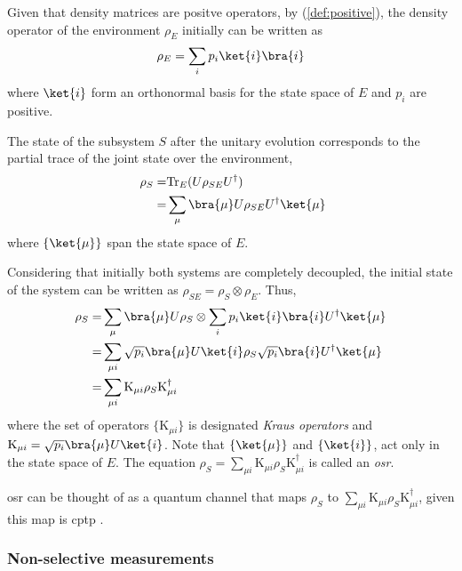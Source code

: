 Given that density matrices are positve operators, by (\autoref{def:positive}), the density operator of the environment $\rho_E$ initially can be written as 
\begin{equation*}
  \rho_E = \sum_{i} p_{i} \ket{i} \bra{i}
\end{equation*}
where $\ket{i}$ form an orthonormal basis for the state space of $E$ and $p_{i}$ are positive. 

The state of the subsystem $S$ after the unitary evolution corresponds to the partial trace of the joint state over the environment,
\begin{align*}
  \rho_{S} = & \text{Tr}_{E}(U \rho_{SE} U^{\dag}) \\
 = & \sum_{\mu} \bra{\mu} U \rho_{SE} U^{\dag} \ket{\mu}
\end{align*}
where $\{\ket{\mu}\}$ span the state space of $E$.

 
Considering that initially both systems are completely decoupled, the initial state of the system can be written as $ \rho_{SE} = \rho_{S} \otimes \rho_{E}$. Thus,
\begin{align*} 
  \rho_{S} = & \sum_{\mu} \bra{\mu} U \rho_{S} \otimes \sum_{i} p_{i} \ket{i} \bra{i} U^{\dag} \ket{\mu} \\
  = & \sum_{\mu i}  \sqrt{p_{i}} \bra{\mu} U \ket{i} \rho_{S} \sqrt{p_{i}} \bra{i} U^{\dag} \ket{\mu}  \\ 
  = & \sum_{\mu i} \text{K}_{\mu i} \rho_{S} \text{K}_{\mu i}^{\dag}
\end{align*}
where the set of operators $\{\text{K}_{\mu i}\}$ is designated \emph{Kraus operators} and $\text{K}_{\mu i} = \sqrt{p_{i}} \bra{\mu} U \ket{i}$. Note that $\{\ket{\mu}\}$ and $\{\ket{i}\}$, act only in the state space of $E$. The equation $ \rho_{S} = \sum_{\mu i} \text{K}_{\mu i} \rho_{S} \text{K}_{\mu i}^{\dag} $ is called an \emph{\acrfull{osr}}.

\acrshort{osr} can be thought of as a quantum channel that maps $\rho_{S}$ to $\sum_{\mu i} \text{K}_{\mu i} \rho_{S} \text{K}_{\mu i}^{\dag}$, given this map is \acrshort{cptp} \cite{lidar2019lecture}. 

\subsubsection{Non-selective measurements}

